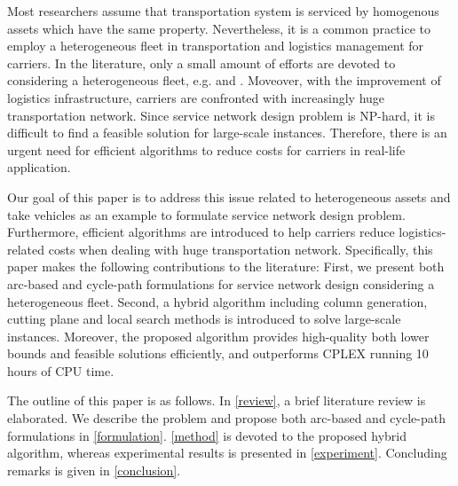 \documentclass[11pt,nonblindrev,fleqn]{article}
\begin{document}
Most researchers assume that transportation system is serviced by homogenous assets which have the same property. Nevertheless, it is a common practice to employ a heterogeneous fleet in transportation and logistics management for carriers. In the literature, only a small amount of efforts are devoted to considering a heterogeneous fleet, e.g. \cite{Kim1999Multimodal} and \cite{li2017design}. Moveover, with the improvement of logistics infrastructure, carriers are confronted with increasingly huge transportation network. Since service network design problem is NP-hard, it is difficult to find a feasible solution for large-scale instances. Therefore, there is an urgent need for efficient algorithms to reduce costs for carriers in real-life application.

Our goal of this paper is to address this issue related to heterogeneous assets and take vehicles as an example to formulate service network design problem. Furthermore, efficient algorithms are introduced to help carriers reduce logistics-related costs when dealing with huge transportation network. Specifically, this paper makes the following contributions to the literature: First, we present both arc-based and cycle-path formulations for service network design considering a heterogeneous fleet. Second, a hybrid algorithm including column generation, cutting plane and local search methods is introduced to solve large-scale instances. Moreover, the proposed algorithm provides high-quality both lower bounds and feasible solutions efficiently, and outperforms CPLEX running 10 hours of CPU time.

The outline of this paper is as follows. In \autoref{review}, a brief literature review is elaborated. We describe the problem and propose both arc-based and cycle-path formulations in \autoref{formulation}. \autoref{method} is devoted to the proposed hybrid algorithm, whereas experimental results is presented in \autoref{experiment}. Concluding remarks is given in \autoref{conclusion}.
\end{document}
